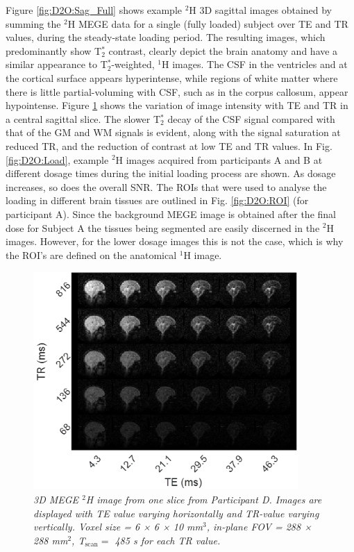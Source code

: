Figure \ref{fig:D2O:Sag_Full} shows example $^2$H 3D sagittal images obtained by summing the $^2$H \ac{MEGE} data for a single (fully loaded) subject over \ac{TE} and \ac{TR} values, during the steady-state loading period. The resulting images, which predominantly show T$_2^*$ contrast, clearly depict the brain anatomy and have a similar appearance to T$_2^*$-weighted, $^1$H images. The \ac{CSF} in the ventricles and at the cortical surface appears hyperintense, while regions of white matter where there is little partial-voluming with \ac{CSF}, such as in the corpus callosum, appear hypointense. Figure \ref{fig:D2O:TR_TE} shows the variation of image intensity with TE and TR in a central sagittal slice. The slower T$_2^*$ decay of the CSF signal compared with that of the \ac{GM} and \ac{WM} signals is evident, along with the signal saturation at reduced \ac{TR}, and the reduction of contrast at low \ac{TE} and \ac{TR} values. In Fig. \ref{fig:D2O:Load}, example $^2$H images acquired from participants A and B at different dosage times during the initial loading process are shown. As dosage increases, so does the overall \ac{SNR}. The \ac{ROI}s that were used to analyse the loading in different brain tissues are outlined in Fig. \ref{fig:D2O:ROI} (for participant A). Since the background \ac{MEGE} image is obtained after the final dose for Subject A the tissues being segmented are easily discerned in the $^2$H images. However, for the lower dosage images this is not the case, which is why the \ac{ROI}’s are defined on the anatomical $^1$H image. 

\begin{figure}[H]
    \centering
    \includegraphics[width = 0.9\textwidth]{Figures/D2O/TR_TE.png}
    \caption{\textit{3D MEGE $^2$H image from one slice from Participant D. Images are displayed with TE value varying horizontally and TR-value varying vertically. Voxel size = 6 × 6 × 10 mm$^3$, in-plane FOV = 288 × 288 mm$^2$, T$_\textrm{scan} =$ 485 s for each \ac{TR} value.}}
    \label{fig:D2O:TR_TE}
\end{figure}

